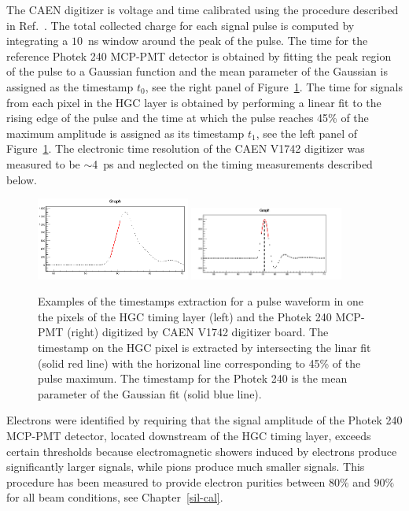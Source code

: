The CAEN digitizer is voltage and time calibrated using the  procedure
described in Ref.~\cite{Kim201467}. The total collected charge for each signal
pulse is computed by integrating a $10$~ns window around the peak of the pulse.
The time for the reference Photek 240 MCP-PMT detector is obtained by fitting the
peak region of the pulse to a Gaussian function and the mean parameter of the
Gaussian is assigned as the timestamp $t_0$, see the right panel of Figure~\ref{hgc:fits}. The time for signals from
each pixel in the HGC layer is obtained by performing a linear fit to the rising edge of the
pulse and the time at which the pulse reaches 45\% of the maximum amplitude is
assigned as its timestamp $t_1$, see the left panel of Figure~\ref{hgc:fits}. The electronic time resolution
of the CAEN V1742 digitizer was measured to be $\sim$4~ps and
neglected on the timing measurements described below.
\begin{figure}[h] 
\centering
\includegraphics[width=0.45\textwidth]{HGC/pixel_linear_fit.png} 
\includegraphics[width=0.45\textwidth]{HGC/photek_gaussian.png} 
\caption{Examples of the timestamps extraction for a pulse waveform in
  one the pixels of the HGC timing layer (left) and
the Photek 240 MCP-PMT (right) digitized by CAEN V1742 digitizer
board. The timestamp on the HGC pixel is extracted by intersecting the
linar fit (solid red line) with the horizonal line corresponding to
45\% of the pulse maximum. The timestamp for the Photek 240 is the
mean parameter of the Gaussian fit (solid blue line).} 
\label{hgc:fits} 
\end{figure} 

Electrons were identified by requiring that the signal amplitude of
the Photek 240 MCP-PMT detector, located downstream of the HGC timing layer, exceeds certain thresholds because electromagnetic showers induced by electrons
produce significantly larger signals, while pions produce much smaller
signals. This procedure has been measured to provide electron purities
between $80\%$ and $90\%$ for all beam conditions, see
Chapter~\ref{sil-cal}.
